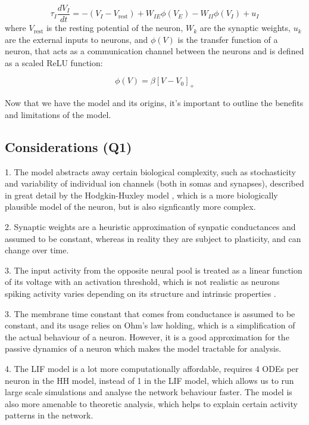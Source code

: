 \documentclass[10pt,twocolumn]{article}
\begin{document}
\begin{equation}
    \tau_I \frac{dV_I}{dt} =
    -(V_I - V_{\text{rest}})
    + W_{IE} \phi(V_E)
    - W_{II} \phi(V_I) + u_I
\end{equation}
where $V_{\text{rest}}$ is the resting potential of the neuron, $W_{k}$ are the
synaptic weights, $u_k$ are the external inputs to neurons,
and $\phi(V)$ is the transfer function of a neuron, that acts as
a communication channel between the neurons and is defined as a scaled ReLU function:

\begin{equation}
    \phi(V) = \beta[V-V_0]_+
\end{equation}

Now that we have the model and its origins, it's important to outline
the benefits and limitations of the model.

\subsection{Considerations (Q1)}
1. The model abstracts away certain biological complexity, such as stochasticity and
variability of individual ion channels (both in somas and synapses), described in
great detail by the Hodgkin-Huxley model \cite{hodgkin1952quantitative}, which is
a more biologically plausible model of the neuron,
but is also signficantly more complex.

2. Synaptic weights are a heuristic approximation of synpatic conductances
and assumed to be constant, whereas in reality they are
subject to plasticity, and can change over time.

3. The input activity from the opposite neural pool is treated as a
linear function of its voltage with an activation threshold,
which is not realistic as neurons spiking activity varies depending
on its structure and intrinsic properties \cite{izhikevich2003simple}.

3. The membrane time constant that comes from conductance is assumed
to be constant, and its usage relies on Ohm's law holding, which is
a simplification of the actual behaviour of a neuron.
However, it is a good approximation for the passive dynamics of a neuron
which makes the model tractable for analysis.

4. The LIF model is a lot more computationally affordable, requires 4 ODEs
per neuron in the HH model, instead of 1 in the LIF model,
which allows us to run large scale simulations and analyse
the network behaviour faster. The model is also more amenable
to theoretic analysis, which helps to explain certain activity patterns in the network.
\end{document}
